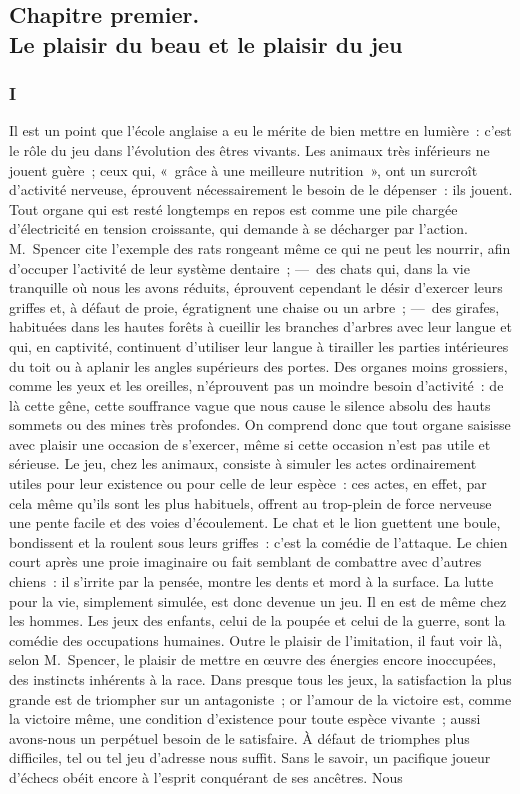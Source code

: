 \documentclass[french,twoside]{book} %
\begin{document}
\subsection[{Chapitre premier. Le plaisir du beau et le plaisir du jeu}]{Chapitre premier. \\
Le plaisir du beau et le plaisir du jeu}
\subsubsection[{I}]{I}
\noindent  Il est un point que l’école anglaise a eu le mérite de bien mettre en lumière : c’est le rôle du jeu dans l’évolution des êtres vivants. Les animaux très inférieurs ne jouent guère ; ceux qui, « grâce à une meilleure nutrition », ont un surcroît d’activité nerveuse, éprouvent nécessairement le besoin de le dépenser : ils jouent. Tout organe qui est resté longtemps en repos est comme une pile chargée d’électricité en tension croissante, qui demande à se décharger par l’action. M. Spencer cite l’exemple des rats rongeant même ce qui ne peut les nourrir, afin d’occuper l’activité de leur système dentaire ; — des chats qui, dans la vie tranquille où nous les avons réduits, éprouvent cependant le désir d’exercer leurs griffes et, à défaut de proie, égratignent une chaise ou un arbre ; — des girafes, habituées dans les hautes forêts à cueillir les branches d’arbres avec leur langue et qui, en captivité, continuent d’utiliser leur langue à tirailler les parties intérieures du toit ou à aplanir les angles supérieurs des portes. Des organes moins grossiers, comme les yeux et les oreilles,  n’éprouvent pas un moindre besoin d’activité : de là cette gêne, cette souffrance vague que nous cause le silence absolu des hauts sommets ou des mines très profondes. On comprend donc que tout organe saisisse avec plaisir une occasion de s’exercer, même si cette occasion n’est pas utile et sérieuse. Le jeu, chez les animaux, consiste à simuler les actes ordinairement utiles pour leur existence ou pour celle de leur espèce : ces actes, en effet, par cela même qu’ils sont les plus habituels, offrent au trop-plein de force nerveuse une pente facile et des voies d’écoulement. Le chat et le lion guettent une boule, bondissent et la roulent sous leurs griffes : c’est la comédie de l’attaque. Le chien court après une proie imaginaire ou fait semblant de combattre avec d’autres chiens : il s’irrite par la pensée, montre les dents et mord à la surface. La lutte pour la vie, simplement simulée, est donc devenue un jeu. Il en est de même chez les hommes. Les jeux des enfants, celui de la poupée et celui de la guerre, sont la comédie des occupations humaines. Outre le plaisir de l’imitation, il faut voir là, selon M. Spencer, le plaisir de mettre en œuvre des énergies encore inoccupées, des instincts inhérents à la race. Dans presque tous les jeux, la satisfaction la plus grande est de triompher sur un antagoniste ; or l’amour de la victoire est, comme la victoire même, une condition d’existence pour toute espèce vivante ; aussi avons-nous un perpétuel besoin de le satisfaire. À défaut de triomphes plus difficiles, tel ou tel jeu d’adresse nous suffit. Sans le savoir, un pacifique joueur d’échecs obéit encore à l’esprit conquérant de ses ancêtres. Nous  
\end{document}
